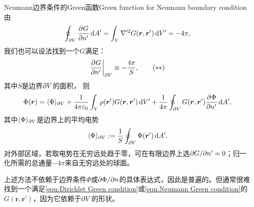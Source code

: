 \begin{theorem}
    {Neumann边界条件的Green函数}{Green function for Neumann boundary condition}
    由
    \[
        \oint_{\partial V}\frac{\partial^{}G}{\partial{n'}^{}}\mathop{}\!\mathrm{d} A' = \int_V\nabla'^2G(\bm r,\bm r')\mathop{}\!\mathrm{d} V' = -4\pi,
    \]
    我们也可以设法找到一个$G$满足：
    \begin{equation}
        \label{eqn:Neumann Green condition}
        {\frac{\partial^{}G}{\partial{n'}^{}}}\biggr\rvert_{\partial V} \equiv -\frac{4\pi}S,
        \tag{$\ast\ast$}
    \end{equation}
    其中$S$是边界$\partial V$的面积，
    则
    \begin{equation}
        \label{eqn:Neumann Green}
        \Phi(\bm r) = \langle\Phi\rangle_{\partial V} + \frac1{4\pi\varepsilon_0}\int_V\rho(\bm r')G(\bm r,\bm r')\mathop{}\!\mathrm{d} V' + \frac1{4\pi}\oint_{\partial V}G(\bm r,\bm r')\frac{\partial^{}\Phi}{\partial{n'}^{}}\mathop{}\!\mathrm{d} A',
    \end{equation}
    其中$\langle\Phi\rangle_{\partial V}$是边界上的平均电势
    \[
        \langle\Phi\rangle_{\partial V} := \frac1S\oint_{\partial V}\Phi(\bm r')\mathop{}\!\mathrm{d} A'.
    \]
    对外部区域，若取电势在无穷远处趋于零，可在有限边界上选$\partial G/\partial n' = 0$；归一化所需的总通量$-4\pi$来自无穷远处的球面。
\end{theorem}

\begin{remark}
    上述方法不依赖于边界条件$\Phi$或$\partial\Phi/\partial n$的具体表达式，因此是普遍的。但通常很难找到一个满足\eqref{eqn:Dirichlet Green condition}或\eqref{eqn:Neumann Green condition}的$G(\bm r, \bm r')$，因为它依赖于$\partial V$的形状。
\end{remark}


